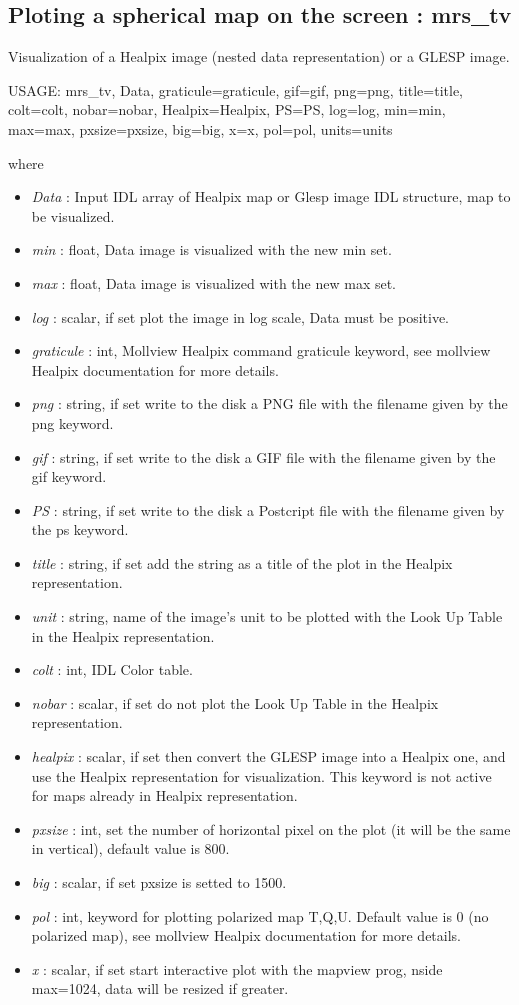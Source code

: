 \subsection{Ploting a spherical map on the screen : mrs\_tv}
Visualization of a Healpix image (nested data representation) or a GLESP image.
{\bf
\begin{center}
     USAGE: mrs\_tv, Data, graticule=graticule, gif=gif, png=png, title=title, colt=colt, nobar=nobar, 
     Healpix=Healpix, PS=PS, log=log, min=min, max=max, pxsize=pxsize, big=big, x=x, pol=pol, units=units
\end{center}}
where
\begin{itemize}
\item {\em Data} : Input IDL array of Healpix map or Glesp image IDL structure, map to be visualized.
\item {\em min} : float, Data image is visualized with the new min set.
\item {\em max} : float, Data image is visualized with the new max set.
\item {\em log} : scalar, if set plot the image in log scale, Data must be positive.
\item {\em graticule} : int, Mollview Healpix command graticule keyword, see mollview Healpix documentation for more details.
\item {\em png} : string, if set write to the disk a PNG file with the filename given by the png keyword.
\item {\em gif} : string, if set write to the disk a GIF file with the filename given by the gif keyword.
\item {\em PS} : string, if set write to the disk a Postcript file with the filename given by the ps keyword.
\item {\em title} : string, if set add the string as a title of the plot in the Healpix representation.
\item {\em unit} : string, name of the image's unit to be plotted with the Look Up Table in the Healpix representation.
\item {\em colt} : int, IDL Color table.
\item {\em nobar} : scalar, if set do not plot the Look Up Table in the Healpix representation.
\item {\em healpix} : scalar, if set then convert the GLESP image into a Healpix one, and use the Healpix 
representation for visualization. This keyword is not active for maps already in Healpix representation.
\item {\em pxsize} : int, set the number of horizontal pixel on the plot (it will be the same in vertical), default value is 800.
\item {\em big} : scalar, if set pxsize is setted to 1500.
\item {\em pol} : int, keyword for plotting polarized map T,Q,U. Default value is 0 (no polarized map), see mollview Healpix documentation for more details.
\item {\em x} : scalar, if set start interactive plot with the mapview prog, nside max=1024, data will be resized if greater.
\end{itemize}



